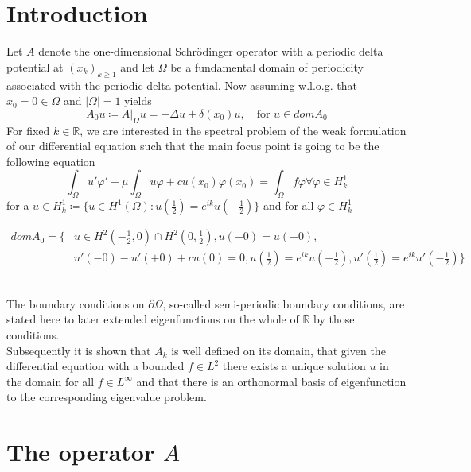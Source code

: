 \documentclass[14pt,a4paper]{scrartcl}
\numberwithin{equation}{section}
\newcommand{\R}{\mathbb{R}}
\begin{document}
\pagestyle{headings}

\section{Introduction}
Let $A$ denote the one-dimensional Schrödinger operator with a periodic delta potential at $(x_{k})_{k \geq 1}$ and let $\Omega$ be a fundamental domain of periodicity associated with the periodic delta potential. Now assuming w.l.o.g. that $x_{0} = 0 \in \Omega$ and $|\Omega| = 1$ yields
	\[ A_{0} u \coloneqq A|_{\Omega} u = - \Delta u + \delta(x_{0}) u, \quad \text{for } u \in dom A_{0} \]
For fixed $k \in \R$, we are interested in the spectral problem of the weak formulation of our differential equation such that the main focus point is going to be the following equation
\[ \int_{\Omega} u' \varphi' - \mu \int_{\Omega} u \varphi + c u(x_{0}) \varphi(x_{0}) = \int_{\Omega} f \varphi \forall \varphi \in H^{1}_{k} \]
for a $u \in H^{1}_{k} \coloneqq \big\{ u \in H^{1}(\Omega) : u(\frac{1}{2}) = e^{ik} u(-\frac{1}{2}) \big\}$ and for all $\varphi \in H^{1}_{k}$

\begin{align*}
	dom A_{0} = \Big\{ & u \in H^{2}(-\frac{1}{2}, 0) \cap H^{2}(0, \frac{1}{2}), u(-0) = u(+0), \\
		& u'(-0) - u'(+0) + c u(0) = 0, u(\frac{1}{2}) = e^{ik} u(-\frac{1}{2}), u'(\frac{1}{2}) = e^{ik} u'(-\frac{1}{2}) \Big\} 
\end{align*}
~\

The boundary conditions on $\partial \Omega$, so-called semi-periodic boundary conditions, are stated here to later extended eigenfunctions on the whole of $\R$ by those conditions.
~\\

Subsequently it is shown that $A_{k}$ is well defined on its domain, that given the differential equation with a bounded $f \in L^{2}$ there exists a unique solution $u$ in the domain for all $f \in L^{\infty}$ and that there is an orthonormal basis of eigenfunction to the corresponding eigenvalue problem.
\newpage

\section{The operator $A$}
\end{document}
